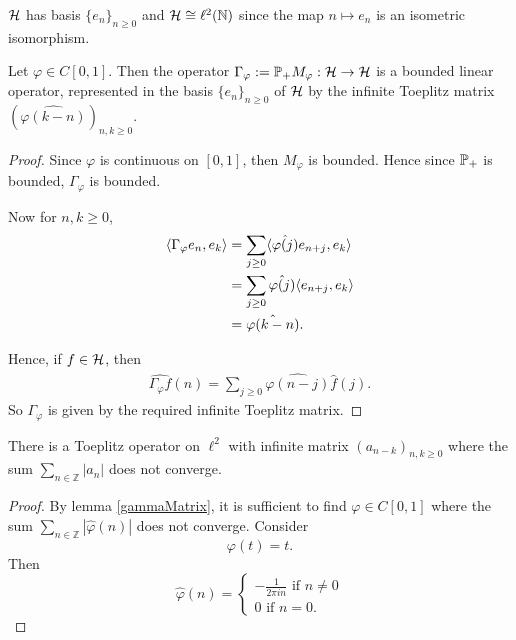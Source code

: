 \documentclass{unswmaths}
\begin{document}
\begin{remark}
    $\mathcal{H}$ has basis $\{e_n\}_{n\geq 0}$ and $\mathcal{H} \cong \ell^2(\mathbb{N})$
    since the map $n\mapsto e_n$ is an isometric isomorphism.
\end{remark}
\begin{lemma}
\label{gammaMatrix}
    Let $\varphi \in C[0,1]$. Then the operator $\Gamma_\varphi := \mathbb{P}_+ M_\varphi :\mathcal{H}\rightarrow\mathcal{H}$
    is a bounded linear operator, represented in the basis $\{e_n\}_{n\geq 0}$
    of $\mathcal{H}$ by the infinite Toeplitz matrix $(\hat{\varphi(k-n)})_{n,k\geq 0}$.
\end{lemma}
\begin{proof}
    Since $\varphi$ is continuous on $[0,1]$, then $M_\varphi$ is bounded. Hence since $\mathbb{P}_+$
    is bounded, $\Gamma_\varphi$ is bounded. 
    
    Now for $n,k\geq 0$,
    \begin{align*}
        \langle \Gamma_\varphi e_n,e_k\rangle &= \sum_{j\geq0} \langle \hat{\varphi(j)}e_{n+j},e_k\rangle\\
        &= \sum_{j\geq 0} \hat{\varphi(j)} \langle e_{n+j},e_k\rangle\\
        &= \hat{\varphi(k-n)}.
    \end{align*}
    
    Hence, if $f \in \mathcal{H}$, then
    \begin{align*}
        \hat{\Gamma_\varphi f}(n) = \sum_{j\geq 0} \hat{\varphi(n-j)}\hat{f}(j).
    \end{align*}
    So $\Gamma_\varphi$ is given by the required infinite Toeplitz matrix.
\end{proof}
\begin{theorem}
    There is a Toeplitz operator on $\ell^2$ with infinite matrix $(a_{n-k})_{n,k\geq 0}$
    where the sum $\sum_{n\in \mathbb{Z}} |a_n|$ does not converge.
\end{theorem}
\begin{proof}
    By lemma \ref{gammaMatrix}, it is sufficient to find $\varphi \in C[0,1]$
    where the sum $\sum_{n\in \mathbb{Z}} |\hat{\varphi}(n)|$
    does not converge.
    Consider
    \begin{equation*}
        \varphi(t) = t.
    \end{equation*}
    Then
    \begin{equation*}
        \hat{\varphi}(n) = \begin{cases}
            -\frac{1}{2\pi i n}\text{ if }n\neq 0\\
            0\text{ if }n = 0.
        \end{cases}
    \end{equation*}
\end{proof}
\end{document}
